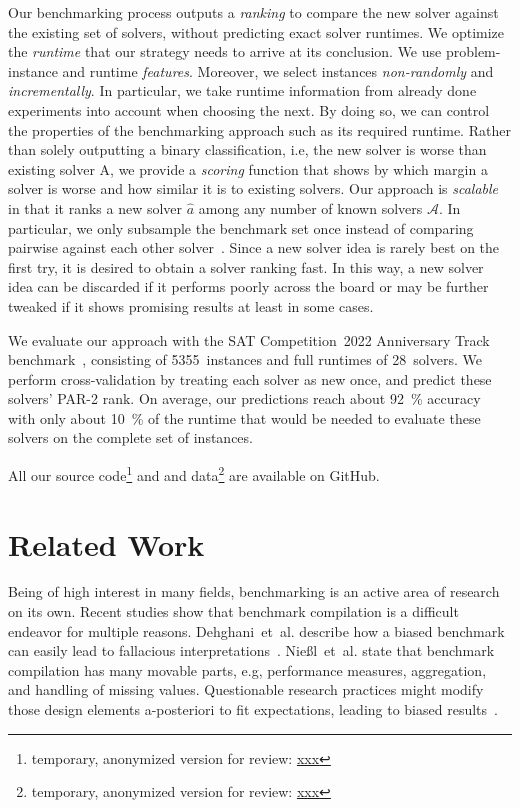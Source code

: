 \documentclass[runningheads]{llncs}
\begin{document}
Our benchmarking process outputs a \emph{ranking} to compare the new solver against the existing set of solvers, without predicting exact solver runtimes.
We optimize the \emph{runtime} that our strategy needs to arrive at its conclusion.
We use problem-instance and runtime \emph{features}.
Moreover, we select instances \emph{non-randomly} and \emph{incrementally}.
In particular, we take runtime information from already done experiments into account when choosing the next.
By doing so, we can control the properties of the benchmarking approach such as its required runtime.
Rather than solely outputting a binary classification, i.e, the new solver is worse than existing solver A, we provide a \emph{scoring} function that shows by which margin a solver is worse and how similar it is to existing solvers.
Our approach is \emph{scalable} in that it ranks a new solver $\hat{a}$ among any number of known solvers $\mathcal{A}$.
In particular, we only subsample the benchmark set once instead of comparing pairwise against each other solver~\cite{MatriconAFSH21}.
Since a new solver idea is rarely best on the first try, it is desired to obtain a solver ranking fast.
In this way, a new solver idea can be discarded if it performs poorly across the board or may be further tweaked if it shows promising results at least in some cases.

We evaluate our approach with the SAT Competition~2022 Anniversary Track benchmark~\cite{sat2022}, consisting of 5355~instances and full runtimes of 28~solvers.
We perform cross-validation by treating each solver as new once, and predict these solvers' PAR-2 rank.
On average, our predictions reach about \SI{92}{\%} accuracy with only about \SI{10}{\%} of the runtime that would be needed to evaluate these solvers on the complete set of instances.

All our source code\footnote{temporary, anonymized version for review: \url{xxx}} and and data\footnote{temporary, anonymized version for review: \url{xxx}} are available on GitHub.


\section{Related Work}

Being of high interest in many fields, benchmarking is an active area of research on its own. 
Recent studies show that benchmark compilation is a difficult endeavor for multiple reasons.
Dehghani~et~al. describe how a biased benchmark can easily lead to fallacious interpretations~\cite{abs-2107-07002}.
Nießl~et~al. state that benchmark compilation has many movable parts, e.g, performance measures, aggregation, and handling of missing values.
Questionable research practices might modify those design elements a-posteriori to fit expectations, leading to biased results~\cite{NiesslHWCB22}.
\end{document}
